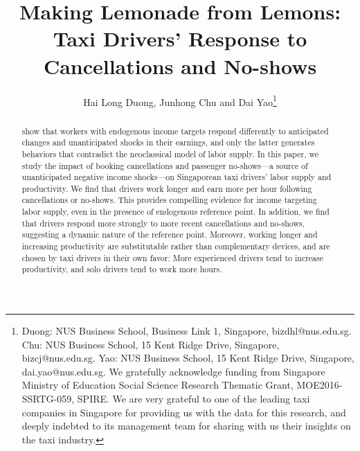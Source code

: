 \documentclass[reviewmode,AEJ]{AEA}
\begin{document}

\title{Making Lemonade from Lemons: Taxi Drivers' Response to Cancellations and No-shows}
\author{Hai Long Duong, Junhong Chu and Dai Yao\thanks{Duong: NUS Business School, Business Link 1, Singapore, bizdhl@nus.edu.sg. Chu: NUS Business School, 15 Kent Ridge Drive, Singapore, bizcj@nus.edu.sg. Yao: NUS Business School, 15 Kent Ridge Drive, Singapore, dai.yao@nus.edu.sg. We gratefully acknowledge funding from Singapore Ministry of Education Social Science Research Thematic Grant, MOE2016-SSRTG-059, SPIRE. We are very grateful to one of the leading taxi companies in Singapore for providing us with the data for this research, and deeply indebted to its management team for sharing with us their insights on the taxi industry.}}


\begin{abstract}
	\citet{kHoszegi2006model} show that workers with endogenous income targets respond differently
	to anticipated changes and unanticipated shocks in their earnings, and only the latter generates
	behaviors that contradict the neoclassical model of labor supply. In this paper, we study the
	impact of booking cancellations and passenger no-shows---a source of unanticipated negative 
	income shocks---on Singaporean taxi drivers' labor supply and productivity. We find that 
	drivers work longer and earn more per hour following cancellations or no-shows. This provides 
	compelling evidence for income targeting labor supply, even in the presence of endogenous 
	reference point. In addition, we find that drivers respond more strongly to more recent 
	cancellations and no-shows, suggesting a dynamic nature of the reference point. Moreover, 
	working longer and increasing productivity are substitutable rather than complementary devices, 
	and are chosen by taxi drivers in their own favor: More experienced drivers tend to increase 
	productivity, and solo drivers tend to work more hours. 
\end{abstract}
\end{document}

